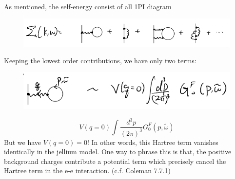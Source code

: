 As mentioned, the self-energy consist of all 1PI diagram
\begin{figure}[H]
    \centering
    \includegraphics[width=\textwidth]{jupyterbook/data/fig/lec19-fig00.png}
\end{figure}
Keeping the lowest order contributions, we have only two terms:
\begin{figure}[H]
    \centering
    \includegraphics[width=\textwidth]{jupyterbook/data/fig/lec19-fig01.png}
\end{figure}
\[ V\left( q=0 \right) \int{\frac{d^3p}{\left( 2\pi \right) ^3}G_{0}^{F}\left( p,\tilde{\omega} \right)}\]
But we have $V(q=0)=0$! In other words, this Hartree term vanishes identically in the jellium model. One way to phrase this is that, the positive background charges contribute a potential term which precisely cancel the Hartree term in the e-e interaction. (c.f. Coleman 7.7.1)

